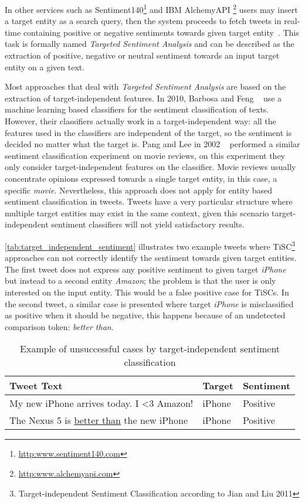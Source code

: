 In other services such as Sentiment140\footnote{\url{http:www.sentiment140.com}} and IBM AlchemyAPI \footnote{\url{http:www.alchemyapi.com}} users may insert a target entity as a search query, then the system proceeds to fetch tweets in real-time containing positive or negative sentiments towards given target entity~\cite{jiang2011target}. This task is formally named \textit{Targeted Sentiment Analysis} and can be described as the extraction of positive, negative or neutral sentiment towards an input target entity on a given text. 

Most approaches that deal with \textit{Targeted Sentiment Analysis} are based on the extraction of target-independent features. In 2010, Barbosa and Feng ~\cite{barbosa2010robust} use a machine learning based classifiers for the sentiment classification of texts. However, their classifiers actually work in a target-independent way: all the features used in the classifiers are independent of the target, so the sentiment is decided no matter what the target is. Pang and Lee in 2002 ~\cite{pang2002thumbs} performed a similar sentiment classification experiment on movie reviews, on this experiment they only consider target-independent features on the classifier. Movie reviews usually concentrate opinions expressed towards a single target entity, in this case, a specific \textit{movie}. Nevertheless, this approach does not apply for entity based sentiment classification in tweets. Tweets have a very particular structure where multiple target entities may exist in the same context, given this scenario target-independent sentiment classifiers will not yield satisfactory results. 

\autoref{tab:target_independent_sentiment} illustrates two example tweets where TiSC\footnote{Target-independent Sentiment Classification according to Jian and Liu 2011} approaches can not correctly identify the sentiment towards given target entities. The first tweet does not express any positive sentiment
to given target \textit{iPhone} but instead to a second entity \textit{Amazon}; the problem is that the user is only interested on the input entity. This would be a false positive case for TiSCs. In the second tweet, a similar case is presented where target \textit{iPhone} is misclassified as positive when it should be negative, this happens because of an undetected comparison token: \textit{better than}. 

\begin{table}[H]
    \centering
    \caption{Example of unsuccessful cases by target-independent sentiment classification }
    \label{tab:target_independent_sentiment}
    \begin{tabular}{l|l|l}
        \textbf{Tweet Text}                         & \textbf{Target}       & \textbf{Sentiment}                       \\ \hline
        My new iPhone arrives today. I <3 Amazon!   & iPhone                &  Positive \\ \hline
        The Nexus 5 is \underline{better than} the new iPhone   & iPhone                & Positive \\ \hline
    \end{tabular}
\end{table}


